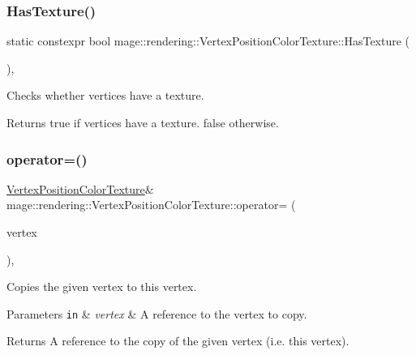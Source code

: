 \subsubsection{\texorpdfstring{Has\+Texture()}{HasTexture()}}
{\footnotesize\ttfamily static constexpr bool mage\+::rendering\+::\+Vertex\+Position\+Color\+Texture\+::\+Has\+Texture (\begin{DoxyParamCaption}{ }\end{DoxyParamCaption})\hspace{0.3cm}{\ttfamily [static]}, {\ttfamily [noexcept]}}

Checks whether vertices have a texture.

\begin{DoxyReturn}{Returns}
{\ttfamily true} if vertices have a texture. {\ttfamily false} otherwise. 
\end{DoxyReturn}
\mbox{\label{structmage_1_1rendering_1_1_vertex_position_color_texture_a6581fcf8532cb638a1e3a1f2199db264}} 
\subsubsection{\texorpdfstring{operator=()}{operator=()}\hspace{0.1cm}{\footnotesize\ttfamily [1/2]}}
{\footnotesize\ttfamily \mbox{\hyperlink{structmage_1_1rendering_1_1_vertex_position_color_texture}{Vertex\+Position\+Color\+Texture}}\& mage\+::rendering\+::\+Vertex\+Position\+Color\+Texture\+::operator= (\begin{DoxyParamCaption}\item[{const \mbox{\hyperlink{structmage_1_1rendering_1_1_vertex_position_color_texture}{Vertex\+Position\+Color\+Texture}} \&}]{vertex }\end{DoxyParamCaption})\hspace{0.3cm}{\ttfamily [default]}, {\ttfamily [noexcept]}}

Copies the given vertex to this vertex.


\begin{DoxyParams}[1]{Parameters}
\mbox{\tt in}  & {\em vertex} & A reference to the vertex to copy. \\
\hline
\end{DoxyParams}
\begin{DoxyReturn}{Returns}
A reference to the copy of the given vertex (i.\+e. this vertex). 
\end{DoxyReturn}
\mbox{\label{structmage_1_1rendering_1_1_vertex_position_color_texture_a4c338713e4f1a1ad4d66188791bf365a}} 
